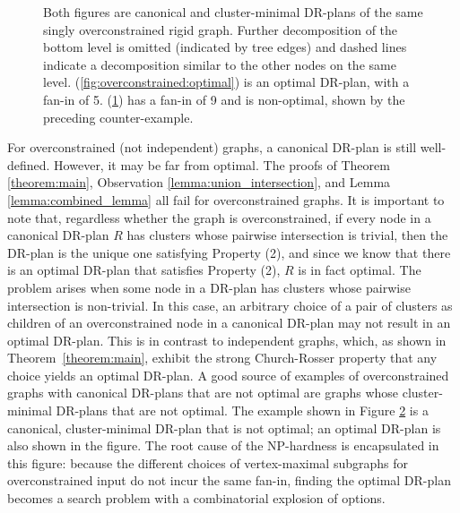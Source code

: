 \begin{figure}
\begin{subfigure}{0.5\linewidth}
        \caption{}\label{fig:overconstrained:not_optimal}
    \end{subfigure}%
    \caption{
    Both figures are canonical and cluster-minimal DR-plans of the same singly overconstrained rigid graph. Further decomposition of the bottom level is omitted (indicated by tree edges) and dashed lines indicate a decomposition similar to the other nodes on the same level. (\ref{fig:overconstrained:optimal}) is an optimal DR-plan, with a fan-in of 5. (\ref{fig:overconstrained:not_optimal}) has a fan-in of 9 and is non-optimal, shown by the preceding counter-example.
    }
    \label{fig:overconstrained}
\end{figure}%


For overconstrained (not independent) graphs, a canonical DR-plan is still well-defined.
However, it may be far from optimal. The proofs of Theorem \ref{theorem:main}, Observation \ref{lemma:union_intersection}, and Lemma \ref{lemma:combined_lemma} all fail for overconstrained graphs.
It is important to note that, regardless whether the graph is overconstrained, if every node in a canonical DR-plan $R$ has clusters whose pairwise intersection is trivial, then the DR-plan is the unique one satisfying Property (2), and since we know that there is an optimal DR-plan that satisfies Property (2), $R$ is in fact optimal. The problem arises when some node in a DR-plan has clusters whose pairwise intersection is non-trivial.
In this case, an arbitrary choice of a pair of clusters as children of an overconstrained node in a canonical DR-plan may not result in an optimal DR-plan. This is in contrast to independent graphs, which, as shown in Theorem~\ref{theorem:main}, exhibit the strong Church-Rosser property that any choice yields an optimal DR-plan.
A good source of examples of overconstrained graphs with canonical DR-plans that are not optimal are graphs whose cluster-minimal DR-plans that are not optimal. The example shown in Figure \ref{fig:overconstrained} is a canonical, cluster-minimal DR-plan that is not optimal; an optimal DR-plan is also shown in the figure.
The root cause of the NP-hardness is encapsulated in this figure: because the different choices of vertex-maximal subgraphs for overconstrained input do not incur the same fan-in, finding the optimal DR-plan becomes a search problem with a combinatorial explosion of options.


